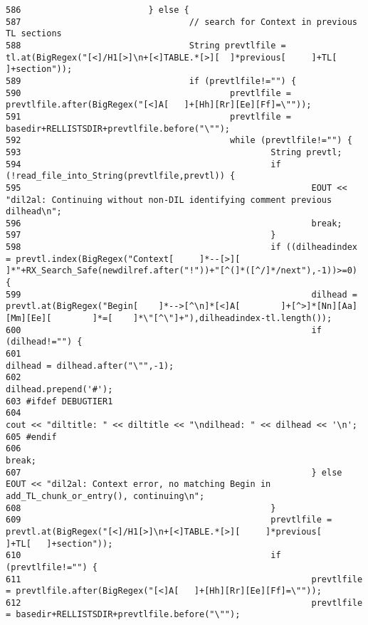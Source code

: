 \begin{verbatim}
586                         } else {
587                                 // search for Context in previous TL sections
588                                 String prevtlfile = tl.at(BigRegex("[<]/H1[>]\n+[<]TABLE.*[>][  ]*previous[     ]+TL[   ]+section"));
589                                 if (prevtlfile!="") {
590                                         prevtlfile = prevtlfile.after(BigRegex("[<]A[   ]+[Hh][Rr][Ee][Ff]=\""));
591                                         prevtlfile = basedir+RELLISTSDIR+prevtlfile.before("\"");
592                                         while (prevtlfile!="") {
593                                                 String prevtl;
594                                                 if (!read_file_into_String(prevtlfile,prevtl)) {
595                                                         EOUT << "dil2al: Continuing without non-DIL identifying comment previous dilhead\n";
596                                                         break;
597                                                 }
598                                                 if ((dilheadindex = prevtl.index(BigRegex("Context[     ]*--[>][        ]*"+RX_Search_Safe(newdilref.after("!"))+"[^(]*([^/]*/next"),-1))>=0) {
599                                                         dilhead = prevtl.at(BigRegex("Begin[    ]*-->[^\n]*[<]A[        ]+[^>]*[Nn][Aa][Mm][Ee][        ]*=[    ]*\"[^\"]+"),dilheadindex-tl.length());
600                                                         if (dilhead!="") {
601                                                                 dilhead = dilhead.after("\"",-1);
602                                                                 dilhead.prepend('#');
603 #ifdef DEBUGTIER1
604                                                                 cout << "diltitle: " << diltitle << "\ndilhead: " << dilhead << '\n';
605 #endif
606                                                                 break;
607                                                         } else EOUT << "dil2al: Context error, no matching Begin in add_TL_chunk_or_entry(), continuing\n";
608                                                 }
609                                                 prevtlfile = prevtl.at(BigRegex("[<]/H1[>]\n+[<]TABLE.*[>][     ]*previous[     ]+TL[   ]+section"));
610                                                 if (prevtlfile!="") {
611                                                         prevtlfile = prevtlfile.after(BigRegex("[<]A[   ]+[Hh][Rr][Ee][Ff]=\""));
612                                                         prevtlfile = basedir+RELLISTSDIR+prevtlfile.before("\"");

\end{verbatim}
